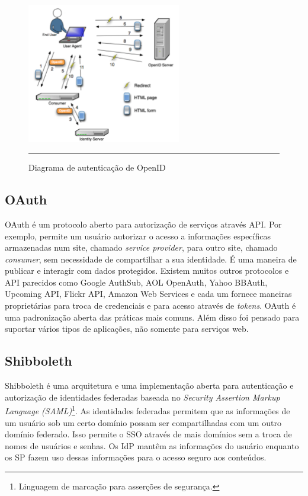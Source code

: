 \begin{figure}[htbp]
  \centering
  \includegraphics[width=0.6\textwidth]{./Figure/OpenID_Scenario.pdf}
  \rule{35em}{0.5pt}
  \caption[Diagrama de autenticação de OpenID]{Diagrama de autenticação de OpenID}
  \label{fig:OpenID}
\end{figure}

\subsection{OAuth}
OAuth é um protocolo aberto para autorização de serviços através
API. Por exemplo, permite um usuário autorizar o acesso a
informações específicas armazenadas num site, chamado \emph{service
  provider}, para outro site, chamado \emph{consumer}, sem necessidade
de compartilhar a sua identidade. É uma maneira de publicar e
interagir com dados protegidos. Existem muitos outros protocolos e API
parecidos como Google AuthSub, AOL OpenAuth, Yahoo
BBAuth, Upcoming API, Flickr API, Amazon Web Services e cada um
fornece maneiras proprietárias para troca de credenciais e para acesso
através de \emph{tokens}. OAuth é uma padronização aberta das práticas
mais comuns. Além disso foi pensado para suportar vários tipos de
aplicações, não somente para serviços web.

\subsection{Shibboleth}
Shibboleth é uma arquitetura e uma implementação aberta para
autenticação e autorização de identidades federadas baseada no
\emph{Security Assertion Markup Language (SAML)}\footnote{Linguagem de
marcação para asserções de segurança.}. As identidades federadas
permitem que as informações de um usuário sob um certo domínio possam
ser compartilhadas com um outro domínio federado. Isso permite o SSO
através de mais domínios sem a troca de nomes de usuários e senhas. Os
IdP mantêm as informações do usuário enquanto os SP fazem uso dessas
informações para o acesso seguro aos conteúdos. 

